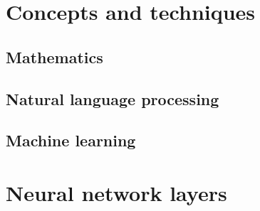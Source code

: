 \appendix
{}
\chapter{Concepts and techniques}
\section{Mathematics}

\section{Natural language processing}

\section{Machine learning}

\chapter{Neural network layers}

